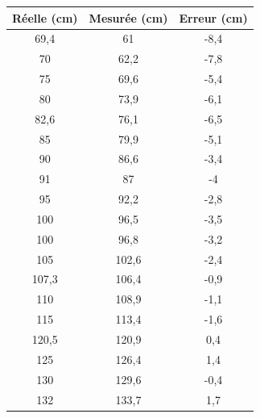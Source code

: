 \begin{figure}[H]
  \centering

  \resizebox{0.5\linewidth}{!}{\FtFhorizontale}

  \vspace{1em}

  \small
  \setlength{\tabcolsep}{4pt}
  \begin{minipage}[t]{0.48\textwidth}
    \vspace{0pt}
    \centering
    \begin{tabular}{|c|c|c|}
      \hline
      Réelle (cm) & Mesurée (cm) & Erreur (cm) \\ \hline
      69,4  & 61    & -8,4 \\ \hline
      70    & 62,2  & -7,8 \\ \hline
      75    & 69,6  & -5,4 \\ \hline
      80    & 73,9  & -6,1 \\ \hline
      82,6  & 76,1  & -6,5 \\ \hline
      85    & 79,9  & -5,1 \\ \hline
      90    & 86,6  & -3,4 \\ \hline
      91    & 87    & -4   \\ \hline
      95    & 92,2  & -2,8 \\ \hline
      100   & 96,5  & -3,5 \\ \hline
      100   & 96,8  & -3,2 \\ \hline
      105   & 102,6 & -2,4 \\ \hline
      107,3 & 106,4 & -0,9 \\ \hline
      110   & 108,9 & -1,1 \\ \hline
      115   & 113,4 & -1,6 \\ \hline
      120,5 & 120,9 & 0,4  \\ \hline
      125   & 126,4 & 1,4  \\ \hline
      130   & 129,6 & -0,4 \\ \hline
      132   & 133,7 & 1,7  \\ \hline
    \end{tabular}
  \end{minipage}\hfill
  \begin{minipage}[t]{0.48\textwidth}
    \vspace{0pt}
    \centering
    \begin{tabular}{|c|c|c|}
      \hline

\end{tabular}
\end{minipage}
\end{figure}
